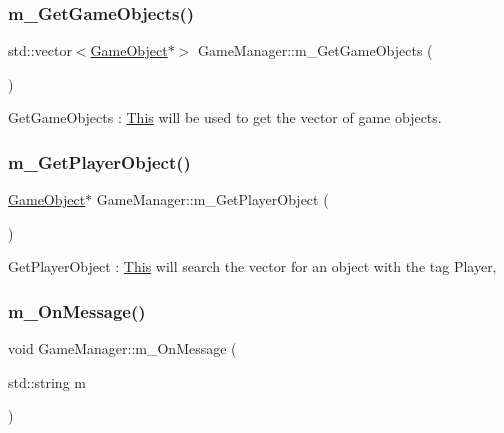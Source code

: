 \subsubsection{\texorpdfstring{m\+\_\+\+Get\+Game\+Objects()}{m\_GetGameObjects()}}
{\footnotesize\ttfamily std\+::vector$<$\mbox{\hyperlink{class_game_object}{Game\+Object}}$\ast$$>$ Game\+Manager\+::m\+\_\+\+Get\+Game\+Objects (\begin{DoxyParamCaption}{ }\end{DoxyParamCaption})\hspace{0.3cm}{\ttfamily [inline]}}

Get\+Game\+Objects \+: \mbox{\hyperlink{class_this}{This}} will be used to get the vector of game objects. \mbox{\label{class_game_manager_a8d4801d6a53e94e2b6bea50fe8767140}} 
\subsubsection{\texorpdfstring{m\+\_\+\+Get\+Player\+Object()}{m\_GetPlayerObject()}}
{\footnotesize\ttfamily \mbox{\hyperlink{class_game_object}{Game\+Object}}$\ast$ Game\+Manager\+::m\+\_\+\+Get\+Player\+Object (\begin{DoxyParamCaption}{ }\end{DoxyParamCaption})\hspace{0.3cm}{\ttfamily [inline]}}

Get\+Player\+Object \+: \mbox{\hyperlink{class_this}{This}} will search the vector for an object with the tag Player, \mbox{\label{class_game_manager_a883605b361a964bf45c91ff6fe935b5c}} 
\subsubsection{\texorpdfstring{m\+\_\+\+On\+Message()}{m\_OnMessage()}}
{\footnotesize\ttfamily void Game\+Manager\+::m\+\_\+\+On\+Message (\begin{DoxyParamCaption}\item[{std\+::string}]{m }\end{DoxyParamCaption})\hspace{0.3cm}{\ttfamily [inline]}}

